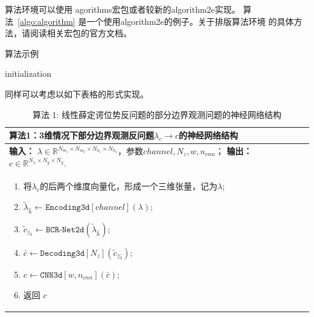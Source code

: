 算法环境可以使用 agorithms宏包或者较新的algorithm2e实现。
算法~\ref{algo:algorithm} 是一个使用algorithm2e的例子。关于排版算法环境
的具体方法，请阅读相关宏包的官方文档。

\begin{algorithm}[htb]
  \caption{算法示例}
  \label{algo:algorithm}
  \small
  \SetAlgoLined

  initialization\;
\end{algorithm}

同样可以考虑以如下表格的形式实现。
\begin{table}[H] 
\centering
\begin{tabular}{p{\textwidth}}
\toprule
\textbf{算法1：3维情况下部分边界观测反问题$\lambda_c\rightarrow c$的神经网络结构}  \\%
\midrule
\textbf{输入：} %
$\lambda\in\mathbb{R}^{N_{m_1}\times N_{m_2}\times N_{h_1}\times N_{h_2}}$，参数$channel,N_{z},w,n_{cnn}$；
\textbf{输出：} %
$c\in \mathbb{R}^{N_x\times N_y\times N_y}$. \\[-15pt]%
\begin{enumerate}[1:]
  \item 将$\lambda_c$的后两个维度向量化，形成一个三维张量，记为$\lambda$;
  \item $\tilde{\lambda}_{\hat{h}}\leftarrow\texttt{Encoding3d}[channel](\lambda)$; %
  \item  $\tilde{c}_{\hat{z}_3}\leftarrow\texttt{BCR-Net2d}(\tilde{\lambda}_{\hat{h}}) $; %
  \item $\bar{c}\leftarrow\texttt{Decoding3d}[N_z](\tilde{c}_{\hat{z_3}})$;%
  \item $c\leftarrow\texttt{CNN3d}[w,n_{cnn}](\bar{c})$;%
  \item 返回 $c$ %
\end{enumerate} \\%
\bottomrule
\end{tabular}
\caption*{算法 1: 线性薛定谔位势反问题的部分边界观测问题的神经网络结构\cite{FY2020}}
\end{table}



